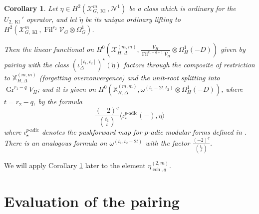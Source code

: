 \documentclass[cjm]{ipart}
\theoremstyle{plain}
\newtheorem{corollary}[theorem]{Corollary}
\theoremstyle{remark}
\DeclareMathOperator{\coh}{coh}
\DeclareMathOperator{\Fil}{Fil}
\DeclareMathOperator{\Gr}{Gr}
\DeclareMathOperator{\Kl}{Kl}
\newcommand{\cN}{\mathcal{N}}
\newcommand{\cV}{\mathcal{V}}
\newcommand{\cX}{\mathcal{X}}
\numberwithin{equation}{subsection}
\begin{document}
   \begin{corollary}\label{cor:unitroot}
    Let $\eta \in H^2(\cX_{G, \Kl}^m, \cN^1)$ be a class which is ordinary for the $U_{2, \Kl}'$ operator, and let $\breve{\eta}$ be its unique ordinary lifting to $H^2(\cX_{G, \Kl}^m,\Fil^{r_2}\cV_G\otimes\Omega^1_G)$.

    Then the linear functional on $H^0\left(\cX_{H, \Delta}^{(m,m)}, \frac{V_H}{\Fil^{r_1 - q + 1} V_H} \otimes \Omega^1_H(-D)\right)$ given by pairing with the class $(\iota_{\Delta}^{[t_1,t_2]})^\star(\breve\eta)$ factors through the composite of restriction to $\mathbb{X}_{H, \Delta}^{(m,m)}$ (forgetting overconvergence) and the unit-root splitting into $\Gr^{r_1 - q} V_H$; and it is given on $H^0\left(\mathbb{X}_{H, \Delta}^{(m,m)}, \omega^{(t_1-2t, t_2)} \otimes \Omega^{1}_H(-D)\right)$, where $t = r_2 - q$, by the formula
    \[ \frac{(-2)^q}{\binom{t_1}{t}}\langle \iota_{\star}^{\text{$p$-adic}}(-), \eta \rangle\]
    where $\iota_{\star}^{\text{$p$-adic}}$ denotes the pushforward map for $p$-adic modular forms defined in \cite[ \S 4]{LPSZ1}. There is an analogous formula on $\omega^{(t_1, t_2-2t)}$ with the factor $\frac{(-2)^q}{\binom{t_2}{t}}$.
   \end{corollary}

   \begin{remark}
    We will apply Corollary \ref{cor:unitroot} later to the element $\eta^{(2,m)}_{\coh,q}$.
   \end{remark}






  \section{Evaluation of the pairing}\label{sect:evaluation}

\end{document}
